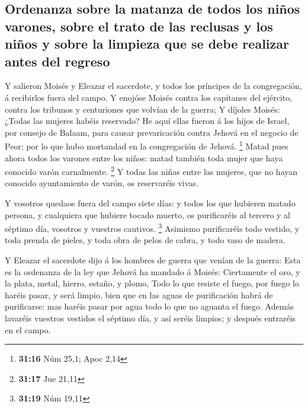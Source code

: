 \hypertarget{ordenanza-sobre-la-matanza-de-todos-los-niuxf1os-varones-sobre-el-trato-de-las-reclusas-y-los-niuxf1os-y-sobre-la-limpieza-que-se-debe-realizar-antes-del-regreso}{%
\subsection{Ordenanza sobre la matanza de todos los niños varones, sobre
el trato de las reclusas y los niños y sobre la limpieza que se debe
realizar antes del
regreso}\label{ordenanza-sobre-la-matanza-de-todos-los-niuxf1os-varones-sobre-el-trato-de-las-reclusas-y-los-niuxf1os-y-sobre-la-limpieza-que-se-debe-realizar-antes-del-regreso}}

 Y salieron Moisés y Eleazar el sacerdote, y todos los
príncipes de la congregación, á recibirlos fuera del campo.
 Y enojóse Moisés contra los capitanes del ejército,
contra los tribunos y centuriones que volvían de la guerra;
 Y díjoles Moisés: ¿Todas las mujeres habéis reservado?
 He aquí ellas fueron á los hijos de Israel, por consejo
de Balaam, para causar prevaricación contra Jehová en el negocio de
Peor; por lo que hubo mortandad en la congregación de Jehová.
\footnote{\textbf{31:16} Núm 25,1; Apoc 2,14}  Matad pues
ahora todos los varones entre los niños: matad también toda mujer que
haya conocido varón carnalmente. \footnote{\textbf{31:17} Jue 21,11}
 Y todas las niñas entre las mujeres, que no hayan
conocido ayuntamiento de varón, os reservaréis vivas.

 Y vosotros quedaos fuera del campo siete días: y todos
los que hubieren matado persona, y cualquiera que hubiere tocado muerto,
os purificaréis al tercero y al séptimo día, vosotros y vuestros
cautivos. \footnote{\textbf{31:19} Núm 19,11}  Asimismo
purificaréis todo vestido, y toda prenda de pieles, y toda obra de pelos
de cabra, y todo vaso de madera.

 Y Eleazar el sacerdote dijo á los hombres de guerra que
venían de la guerra: Esta es la ordenanza de la ley que Jehová ha
mandado á Moisés:  Ciertamente el oro, y la plata, metal,
hierro, estaño, y plomo,  Todo lo que resiste el fuego,
por fuego lo haréis pasar, y será limpio, bien que en las aguas de
purificación habrá de purificarse: mas haréis pasar por agua todo lo que
no aguanta el fuego.  Además lavaréis vuestros vestidos
el séptimo día, y así seréis limpios; y después entraréis en el campo.

